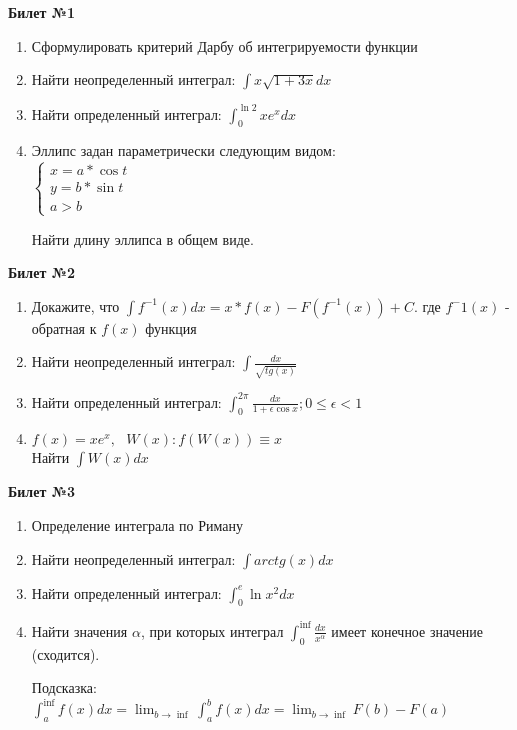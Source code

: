 \documentclass[a4paper, 12pt]{article}
\begin{document}
\begin{center}
    \textbf{Билет №1}
\end{center}
\begin{enumerate}
\item Сформулировать критерий Дарбу об интегрируемости функции
\item Найти неопределенный интеграл: $\int{x\sqrt{1+3x}}dx$
\item Найти определенный интеграл: $\int^{\ln{2}}_{0}{xe^xdx}$
\item Эллипс задан параметрически следующим видом: \\ 

$
	\begin{cases}
		x = a*\cos{t} \\
		y=b*\sin{t} \\
		a > b
		
	\end{cases}
$

Найти длину эллипса в общем виде.

\end{enumerate}

\begin{center}
	\textbf{Билет №2}
\end{center}
\begin{enumerate}
	\item Докажите, что $\int{f^{-1}(x)}dx = x*f(x) - F(f^{-1}(x)) + C$. где $f^-1(x)$ - обратная к $f(x)$ функция
	\item Найти неопределенный интеграл: $\int{\frac{dx}{\sqrt{tg(x)}}}$
	\item Найти определенный интеграл: $\int^{2\pi}_{0}{\frac{dx}{1+\epsilon \cos{x}}; 0 \le \epsilon < 1}$
	\item $f(x) = xe^x,\ \ \ W(x): f(W(x)) \equiv x$ \\ Найти $\int{W(x)dx}$
	
\end{enumerate}

\begin{center}
	\textbf{Билет №3}
\end{center}
\begin{enumerate}
	\item Определение интеграла по Риману
	\item Найти неопределенный интеграл: $\int{arctg(x)dx}$
	\item Найти определенный интеграл: $\int^{e}_{0}{\ln{x^2}dx}$
	\item Найти значения $\alpha$, при которых интеграл $\int_{0}^{\inf}{\frac{dx}{x^{\alpha}}}$ имеет конечное значение (сходится).
	
	Подсказка: $\int_{a}^{\inf}{f(x)dx} = \lim_{b\to\inf}{\int_{a}^{b}{f(x)dx}} = \lim_{b\to\inf}{F(b) - F(a)} $
	
\end{enumerate}
\end{document}
